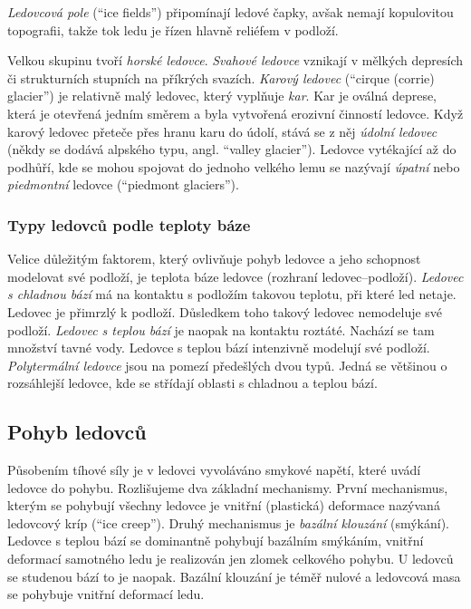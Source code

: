 \emph{Ledovcová pole} (\enquote{ice fields}) připomínají ledové čapky, avšak nemají kopulovitou topografii, takže tok ledu je řízen hlavně reliéfem v podloží.

Velkou skupinu tvoří \emph{horské ledovce}. \emph{Svahové ledovce} vznikají v mělkých depresích či strukturních stupních na příkrých svazích. \emph{Karový ledovec} (\enquote{cirque (corrie) glacier}) je relativně malý ledovec, který vyplňuje \emph{kar}. Kar je oválná deprese, která je otevřená jedním směrem a byla vytvořená erozivní činností ledovce. Když karový ledovec přeteče přes hranu karu do údolí, stává se z něj \emph{údolní ledovec} (někdy se dodává alpského typu, angl. \enquote{valley glacier}). Ledovce vytékající až do podhůří, kde se mohou spojovat do jednoho velkého lemu se nazývají \emph{úpatní} nebo \emph{piedmontní} ledovce (\enquote{piedmont glaciers}).


\subsubsection{Typy ledovců podle teploty báze}
Velice důležitým faktorem, který ovlivňuje pohyb ledovce a jeho schopnost modelovat své podloží, je teplota báze ledovce (rozhraní ledovec--podloží). \emph{Ledovec s chladnou bází} má na kontaktu s podložím takovou teplotu, při které led netaje. Ledovec je přimrzlý k podloží. Důsledkem toho takový ledovec nemodeluje své podloží. \emph{Ledovec s teplou bází} je naopak na kontaktu roztáté. Nachází se tam množství tavné vody. Ledovce s teplou bází intenzivně modelují své podloží. \emph{Polytermální ledovce} jsou na pomezí předešlých dvou typů. Jedná se většinou o rozsáhlejší ledovce, kde se střídají oblasti s chladnou a teplou bází. 

\subsection{Pohyb ledovců}
Působením tíhové síly je v ledovci vyvoláváno smykové napětí, které uvádí ledovce do pohybu. Rozlišujeme dva základní mechanismy. První mechanismus, kterým se pohybují všechny ledovce je vnitřní (plastická) deformace nazývaná ledovcový kríp (\enquote{ice creep}). Druhý mechanismus je \emph{bazální klouzání} (smýkání). Ledovce s teplou bází se dominantně pohybují bazálním smýkáním, vnitřní deformací samotného ledu je realizován jen zlomek celkového pohybu. U ledovců se studenou bází to je naopak. Bazální klouzání je téměř nulové a ledovcová masa se pohybuje vnitřní deformací ledu. 

